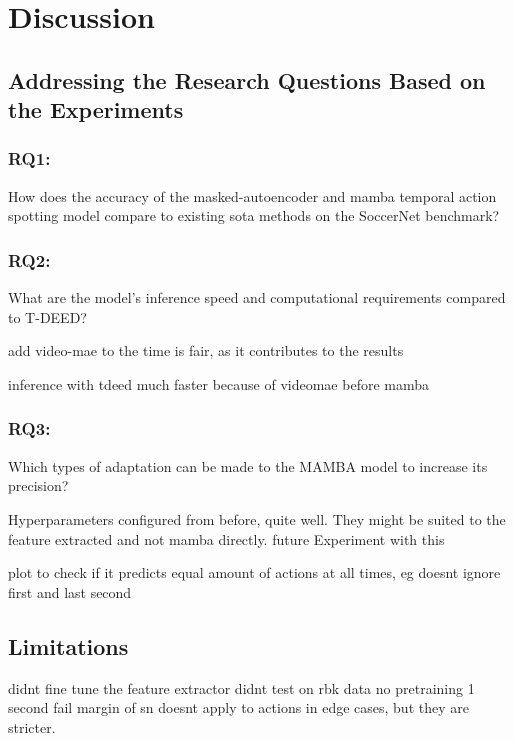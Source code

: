 \chapter{Discussion}
\label{chap:discussion}

\section{Addressing the Research Questions Based on the Experiments}


\subsection{RQ1:} 
How does the accuracy of the masked-autoencoder and mamba temporal action spotting model compare to existing \acrlong{sota} methods on the SoccerNet benchmark?
\subsection{RQ2:} 
What are the model’s inference speed and computational requirements compared to T-DEED?

add video-mae to the time is fair, as it contributes to the results

inference with tdeed much faster because of videomae before mamba


\subsection{RQ3:}
Which types of adaptation can be made to the MAMBA model to increase its precision?

Hyperparameters configured from before, quite well. 
They might be suited to the feature extracted and not mamba directly. 
future Experiment with this


plot to check if it predicts equal amount of actions at all times, eg doesnt ignore first and last second 

\section{Limitations}
didnt fine tune the feature extractor
didnt test on rbk data
no pretraining
1 second fail margin of sn doesnt apply to actions in edge cases, but they are stricter. 

